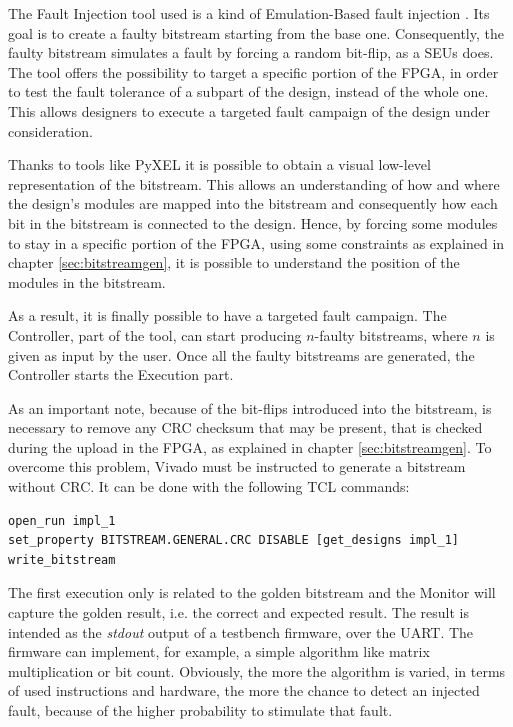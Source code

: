 The Fault Injection tool used is a kind of Emulation-Based fault injection \cite{fit}. Its goal is to create a faulty bitstream starting from the base one. Consequently, the faulty bitstream simulates a fault by forcing a random bit-flip, as a SEUs does. The tool offers the possibility to target a specific portion of the FPGA, in order to test the fault tolerance of a subpart of the design, instead of the whole one. This allows designers to execute a targeted fault campaign of the design under consideration. \bigskip

Thanks to tools like PyXEL \cite{8632000} it is possible to obtain a visual low-level representation of the bitstream. This allows an understanding of how and where the design's modules are mapped into the bitstream and consequently how each bit in the bitstream is connected to the design. Hence, by forcing some modules to stay in a specific portion of the FPGA, using some constraints as explained in chapter \ref{sec:bitstreamgen}, it is possible to understand the position of the modules in the bitstream. \bigskip

As a result, it is finally possible to have a targeted fault campaign. The Controller, part of the tool, can start producing $n$-faulty bitstreams, where $n$ is given as input by the user. Once all the faulty bitstreams are generated, the Controller starts the Execution part.\bigskip

As an important note, because of the bit-flips introduced into the bitstream, is necessary to remove any CRC checksum that may be present, that is checked during the upload in the FPGA, as explained in chapter \ref{sec:bitstreamgen}. To overcome this problem, Vivado must be instructed to generate a bitstream without CRC. It can be done with the following TCL commands:\bigskip

\begin{lstlisting}[style=tcl]
open_run impl_1
set_property BITSTREAM.GENERAL.CRC DISABLE [get_designs impl_1]
write_bitstream
\end{lstlisting}

The first execution only is related to the golden bitstream and the Monitor will capture the golden result, i.e. the correct and expected result. The result is intended as the \textit{stdout} output of a testbench firmware, over the UART. The firmware can implement, for example, a simple algorithm like matrix multiplication or bit count. Obviously, the more the algorithm is varied, in terms of used instructions and hardware, the more the chance to detect an injected fault, because of the higher probability to stimulate that fault. \bigskip


